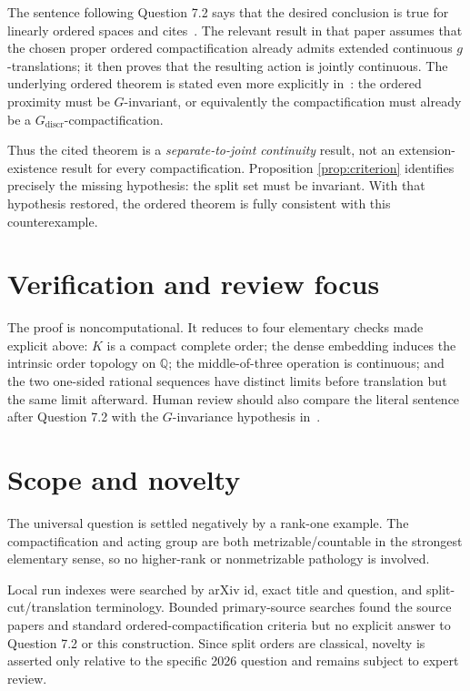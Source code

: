 \documentclass[11pt]{article}
\newcommand{\Q}{\mathbb Q}
\begin{document}
The sentence following Question 7.2 says that the desired conclusion is true
for linearly ordered spaces and cites~\cite{Circular}.  The relevant result in
that paper assumes that the chosen proper ordered compactification already
admits extended continuous $g$-translations; it then proves that the resulting
action is jointly continuous.  The underlying ordered theorem is stated even
more explicitly in~\cite[Theorem~3.18]{Maximal}: the ordered proximity must be
$G$-invariant, or equivalently the compactification must already be a
$G_{\mathrm{discr}}$-compactification.

Thus the cited theorem is a \emph{separate-to-joint continuity} result, not an
extension-existence result for every compactification.  Proposition
\ref{prop:criterion} identifies precisely the missing hypothesis: the split
set must be invariant.  With that hypothesis restored, the ordered theorem is
fully consistent with this counterexample.

\section{Verification and review focus}

The proof is noncomputational.  It reduces to four elementary checks made
explicit above: $K$ is a compact complete order; the dense embedding induces
the intrinsic order topology on $\Q$; the middle-of-three operation is
continuous; and the two one-sided rational sequences have distinct limits
before translation but the same limit afterward.  Human review should also
compare the literal sentence after Question 7.2 with the $G$-invariance
hypothesis in~\cite[Theorem~3.18]{Maximal}.

\section{Scope and novelty}

The universal question is settled negatively by a rank-one example.  The
compactification and acting group are both metrizable/countable in the
strongest elementary sense, so no higher-rank or nonmetrizable pathology is
involved.

Local run indexes were searched by arXiv id, exact title and question, and
split-cut/translation terminology.  Bounded primary-source searches found the
source papers and standard ordered-compactification criteria but no explicit
answer to Question 7.2 or this construction.  Since split orders are classical,
novelty is asserted only relative to the specific 2026 question and remains
subject to expert review.
\end{document}
